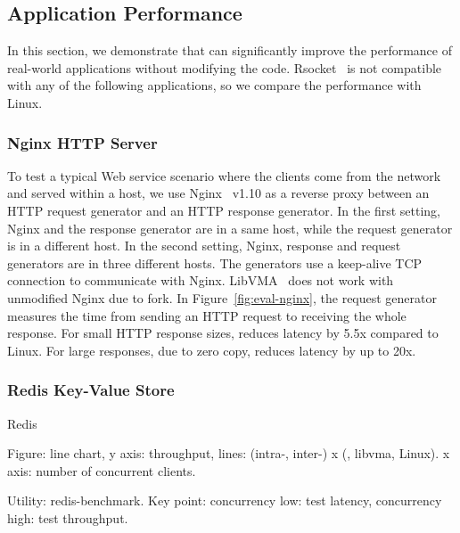 \subsection{Application Performance}
\label{subsec:application}

In this section, we demonstrate that \sys{} can significantly improve the performance of real-world applications without modifying the code.
Rsocket~\cite{rsockets} is not compatible with any of the following applications, so we compare the performance with Linux.

\subsubsection{Nginx HTTP Server}
\quad

To test a typical Web service scenario where the clients come from the network and served within a host, we use Nginx~\cite{nginx} v1.10 as a reverse proxy between an HTTP request generator and an HTTP response generator.
In the first setting, Nginx and the response generator are in a same host, while the request generator is in a different host.
In the second setting, Nginx, response and request generators are in three different hosts.
The generators use a keep-alive TCP connection to communicate with Nginx.
LibVMA~\cite{libvma} does not work with unmodified Nginx due to fork.
In Figure~\ref{fig:eval-nginx}, the request generator measures the time from sending an HTTP request to receiving the whole response.
For small HTTP response sizes, \sys{} reduces latency by 5.5x compared to Linux.
For large responses, due to zero copy, \sys{} reduces latency by up to 20x.



\subsubsection{Redis Key-Value Store}
\quad

Redis~\cite{redis}

Figure: line chart, y axis: throughput, lines: (intra-, inter-) x (\sys{}, libvma, Linux). x axis: number of concurrent clients.

Utility: redis-benchmark.
Key point: concurrency low: test latency, concurrency high: test throughput.

